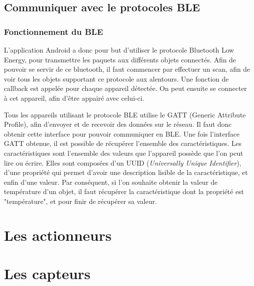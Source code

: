 	\subsection{Communiquer avec le protocoles BLE}
	  \subsubsection{Fonctionnement du BLE}
L'application Android a donc pour but d'utiliser le protocole Bluetooth Low Energy, pour transmettre les 
paquets aux différents objets connectés. Afin de pouvoir se servir de ce bluetooth, il faut commencer par 
effectuer un scan, afin de voir tous les objets supportant ce protocole aux alentours. Une fonction de 
callback est appelée pour chaque appareil détectée. On peut ensuite se connecter à cet appareil, afin d'être 
appairé avec celui-ci.

Tous les appareils utilisant le protocole BLE utilise le GATT (Generic Attribute Profile), afin d'envoyer et 
de recevoir des données sur le réseau. Il faut donc obtenir cette interface pour pouvoir communiquer en BLE. 
Une fois l'interface GATT obtenue, il est possible de récupérer l'ensemble des caractéristiques. Les 
caractéristiques sont l'ensemble des valeurs que l'appareil possède que l'on peut lire ou écrire. Elles sont 
composées d'un UUID (\emph{Universally Unique Identifier}), d'une propriété qui permet d'avoir une 
description lisible de la caractéristique, et enfin d'une valeur. Par conséquent, si l'on souhaite obtenir la 
valeur de température d'un objet, il faut récupérer la caractéristique dont la propriété est "température", 
et pour finir de récupérer sa valeur.




\section{Les actionneurs}
\section{Les capteurs}


